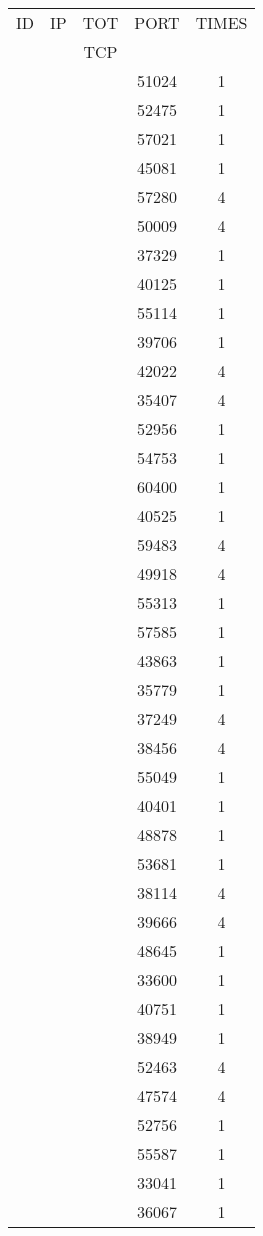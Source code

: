 \documentclass[a4paper]{scrartcl}
\begin{document}
\begin{minipage}[b]{0.5\linewidth}
\begin{tabular}{| c | c | c | c | c |}
\hline
ID & IP & TOT & PORT & TIMES \\ 
   &    & TCP &      &       \\ 
\hline
& & & 51024 & 1 \\ & & & 52475 & 1 \\ & & & 57021 & 1 \\ & & & 45081 & 1 \\ & & & 57280 & 4 \\ & & & 50009 & 4 \\ & & & 37329 & 1 \\ & & & 40125 & 1 \\ & & & 55114 & 1 \\ & & & 39706 & 1 \\ & & & 42022 & 4 \\ & & & 35407 & 4 \\ & & & 52956 & 1 \\ & & & 54753 & 1 \\ & & & 60400 & 1 \\ & & & 40525 & 1 \\ & & & 59483 & 4 \\ & & & 49918 & 4 \\ & & & 55313 & 1 \\ & & & 57585 & 1 \\ & & & 43863 & 1 \\ & & & 35779 & 1 \\ & & & 37249 & 4 \\ & & & 38456 & 4 \\ & & & 55049 & 1 \\ & & & 40401 & 1 \\ & & & 48878 & 1 \\ & & & 53681 & 1 \\ & & & 38114 & 4 \\ & & & 39666 & 4 \\ & & & 48645 & 1 \\ & & & 33600 & 1 \\ & & & 40751 & 1 \\ & & & 38949 & 1 \\ & & & 52463 & 4 \\ & & & 47574 & 4 \\ & & & 52756 & 1 \\ & & & 55587 & 1 \\ & & & 33041 & 1 \\ & & & 36067 & 1 \\ \hline\end{tabular}\end{minipage} \hfill\begin{minipage}[b]{0.5\linewidth}\begin{tabular}{| c | c | c | c | c |}

\end{tabular}
\end{minipage}
\end{document}
